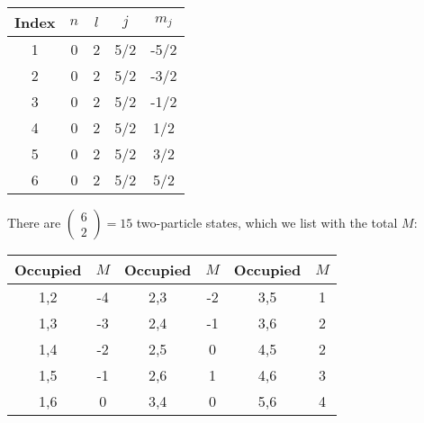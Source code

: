 \documentclass[graybox,sectrefs,envcountresetchap,open=right]{svmonodo}
\begin{document}
{\small   %

\vspace{4mm}

\begin{tabular}{ccccc}
\hline
\multicolumn{1}{c}{ Index } & \multicolumn{1}{c}{ $n$ } & \multicolumn{1}{c}{ $l$ } & \multicolumn{1}{c}{ $j$ } & \multicolumn{1}{c}{ $m_j$ } \\
\hline
1     & 0   & 2   & 5/2 & -5/2  \\
2     & 0   & 2   & 5/2 & -3/2  \\
3     & 0   & 2   & 5/2 & -1/2  \\
4     & 0   & 2   & 5/2 & 1/2   \\
5     & 0   & 2   & 5/2 & 3/2   \\
6     & 0   & 2   & 5/2 & 5/2   \\
\hline
\end{tabular}

\vspace{4mm}

}


\noindent
There are $\left ( \begin{array}{c} 6 \\ 2 \end{array} \right) = 15$ two-particle states, 
which we list with the total $M$:



{\small   %

\vspace{4mm}

\begin{tabular}{cccccc}
\hline
\multicolumn{1}{c}{ Occupied } & \multicolumn{1}{c}{ $M$ } & \multicolumn{1}{c}{ Occupied } & \multicolumn{1}{c}{ $M$ } & \multicolumn{1}{c}{ Occupied } & \multicolumn{1}{c}{ $M$ } \\
\hline
1,2      & -4  & 2,3      & -2  & 3,5      & 1   \\
1,3      & -3  & 2,4      & -1  & 3,6      & 2   \\
1,4      & -2  & 2,5      & 0   & 4,5      & 2   \\
1,5      & -1  & 2,6      & 1   & 4,6      & 3   \\
1,6      & 0   & 3,4      & 0   & 5,6      & 4   \\
\hline
\end{tabular}

\vspace{4mm}

}
\end{document}
